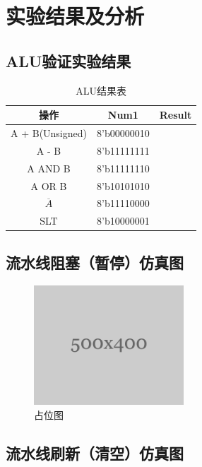 \section{实验结果及分析}
\subsection{ALU验证实验结果}
\begin{table}[htbp]
    \centering
    \begin{tabular}{c|c|c}
        操作            &	Num1        &	Result\\
        \hline
        A + B(Unsigned) &	8’b00000010 & 	\\
        A - B           &	8’b11111111 &	\\
        A AND B         &	8’b11111110 &	\\
        A OR B          &	8’b10101010 &	\\
        $\overline{A}$  &	8’b11110000 &	\\
        SLT             &	8’b10000001 &	\\
        \hline
    \end{tabular}
    \caption{ALU结果表}
    \label{tab:my_label}
\end{table}
\subsection{流水线阻塞（暂停）仿真图}
\begin{figure}[htbp]
    \centering
    \includegraphics[width=0.5\textwidth]{image/place_holder.png}
    \caption{占位图}
    \label{fig:my_label}
\end{figure}
\subsection{流水线刷新（清空）仿真图}